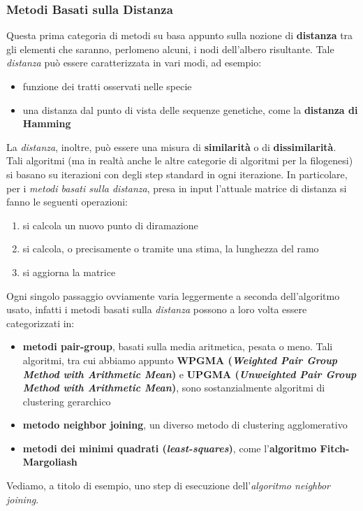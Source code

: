 \documentclass[a4paper,12pt, oneside]{book}
\begin{document}
\subsubsection{Metodi Basati sulla Distanza}
Questa prima categoria di metodi su basa appunto sulla nozione di
\textbf{distanza} tra gli elementi che saranno, perlomeno alcuni, i nodi
dell'albero risultante. Tale \textit{distanza} può essere caratterizzata in vari
modi, ad esempio:
\begin{itemize}
  \item funzione dei tratti osservati nelle specie
  \item una distanza dal punto di vista delle sequenze genetiche, come la
  \textbf{distanza di Hamming} 
\end{itemize}
La \textit{distanza}, inoltre, può essere una misura di \textbf{similarità} o di
\textbf{dissimilarità}.  \\
Tali algoritmi (ma in realtà anche le altre categorie di algoritmi per la
filogenesi) si basano su iterazioni con degli step standard in ogni
iterazione. In particolare, per i \textit{metodi basati sulla distanza}, presa
in input l'attuale matrice di distanza si fanno le seguenti operazioni:
\begin{enumerate}
  \item si calcola un nuovo punto di diramazione
  \item si calcola, o precisamente o tramite una stima, la lunghezza del ramo
  \item si aggiorna la matrice
\end{enumerate}
Ogni singolo passaggio ovviamente varia leggermente a seconda dell'algoritmo
usato, infatti i metodi basati sulla \textit{distanza} possono a loro volta
essere categorizzati in:
\begin{itemize}
  \item \textbf{metodi pair-group}, basati sulla media aritmetica, pesata o
  meno. Tali algoritmi, tra cui abbiamo appunto \textbf{WPGMA (\textit{Weighted
      Pair Group Method with Arithmetic Mean})} e \textbf{UPGMA
    (\textit{Unweighted Pair Group Method with Arithmetic Mean})}, sono
  sostanzialmente algoritmi di clustering gerarchico 
  \item \textbf{metodo neighbor joining}, un diverso metodo di clustering
  agglomerativo  
  \item \textbf{metodi dei minimi quadrati (\textit{least-squares})}, come
  l'\textbf{algoritmo Fitch-Margoliash} 
\end{itemize}
Vediamo, a titolo di esempio, uno step di esecuzione dell'\textit{algoritmo
  neighbor joining}.\\
\end{document}
